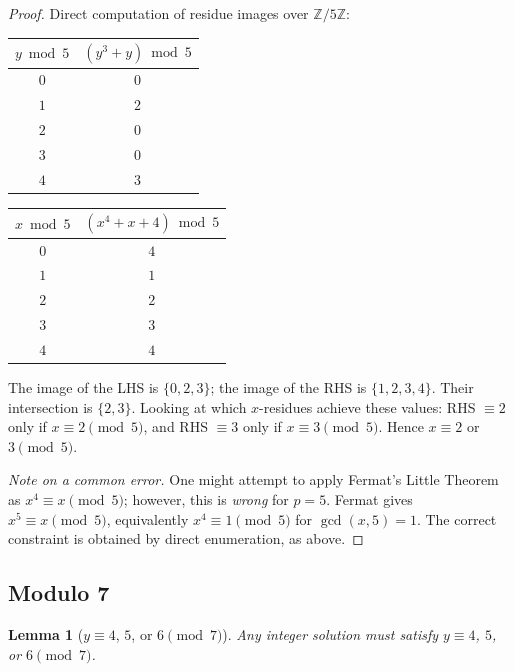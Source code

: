 \documentclass[12pt, a4paper]{article}
\newtheorem{lemma}[theorem]{Lemma}
\theoremstyle{definition}
\newcommand{\Z}{\mathbb{Z}}
\begin{document}
\begin{proof}
  Direct computation of residue images over $\Z/5\Z$:

  \begin{center}
  \begin{tabular}{cc}
  \toprule
  $y \bmod 5$ & $(y^3+y) \bmod 5$ \\
  \midrule
  $0$ & $0$ \\
  $1$ & $2$ \\
  $2$ & $0$ \\
  $3$ & $0$ \\
  $4$ & $3$ \\
  \bottomrule
  \end{tabular}
  \qquad\qquad
  \begin{tabular}{cc}
  \toprule
  $x \bmod 5$ & $(x^4+x+4) \bmod 5$ \\
  \midrule
  $0$ & $4$ \\
  $1$ & $1$ \\
  $2$ & $2$ \\
  $3$ & $3$ \\
  $4$ & $4$ \\
  \bottomrule
  \end{tabular}
  \end{center}

  The image of the LHS is $\{0, 2, 3\}$; the image of the RHS is $\{1, 2, 3, 4\}$.
  Their intersection is $\{2, 3\}$.  Looking at which $x$-residues achieve these
  values: RHS $\equiv 2$ only if $x \equiv 2 \pmod 5$, and RHS $\equiv 3$ only if
  $x \equiv 3 \pmod 5$.  Hence $x \equiv 2$ or $3 \pmod 5$.

  \medskip\noindent
  \emph{Note on a common error.}  One might attempt to apply Fermat's Little Theorem as
  $x^4 \equiv x \pmod 5$; however, this is \emph{wrong} for $p=5$.  Fermat gives
  $x^5 \equiv x \pmod 5$, equivalently $x^4 \equiv 1 \pmod 5$ for
  $\gcd(x,5)=1$.  The correct constraint is obtained by direct enumeration, as above.
\end{proof}

\subsection{Modulo 7}

\begin{lemma}[$y \equiv 4$, $5$, or $6 \pmod{7}$]\label{lem:y_mod7}
  Any integer solution must satisfy $y \equiv 4$, $5$, or $6 \pmod{7}$.
\end{lemma}
\end{document}
